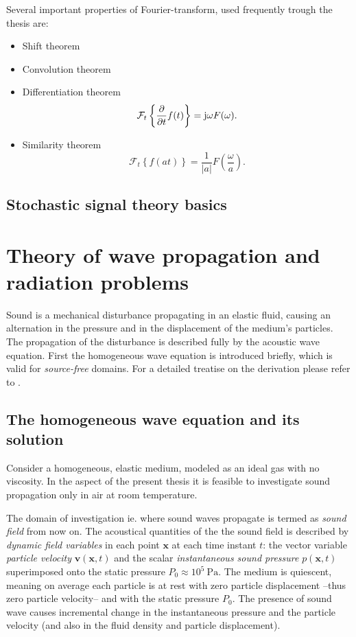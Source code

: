Several important properties of Fourier-transform, used frequently trough the thesis are:
\begin{itemize}
\item Shift theorem
%
\item Convolution theorem
%
\item Differentiation theorem
\begin{equation}
\mathcal{F}_{t} \left\{ \frac{\partial}{\partial t} f(t) \right\}  = \mathrm{j} \omega F(\omega).
\label{Eq:Math:Fourier_tr_diff}
\end{equation}
%
\item Similarity theorem
\begin{equation}
\mathcal{F}_{t} \left\{ f(a t) \right\}  = \frac{1}{|a|} F(\frac{\omega}{a}).
\label{Eq:Math:Fourier_tr_similarity}
\end{equation}
\end{itemize}
  

\subsection{Stochastic signal theory basics}

\newpage
\section{Theory of wave propagation and radiation problems}

Sound is a mechanical disturbance propagating in an elastic fluid, causing an alternation in the pressure and in the displacement of the medium's particles. The propagation of the disturbance is described fully by the acoustic wave equation. First the homogeneous wave equation is introduced briefly, which is valid for \emph{source-free} domains. For a detailed treatise on the derivation please refer to \cite{Beranek1993, Morse1968, Williams1999, Blackstock2000}.

\subsection{The homogeneous wave equation and its solution}

Consider a homogeneous, elastic medium, modeled as an ideal gas with no viscosity. In the aspect of the present thesis it is feasible to investigate sound propagation only in air at room temperature. 

%
The domain of investigation ie. where sound waves propagate is termed as \emph{sound field} from now on.
The acoustical quantities of the the sound field is described by \emph{dynamic field variables} in each point $\mathbf{x}$ at each time instant $t$: the vector variable \emph{particle velocity} $\mathbf{v}(\mathbf{x},t)$ and the scalar \emph{instantaneous sound pressure} $p(\mathbf{x},t)$ superimposed onto the static pressure $P_0 \approx 10^5~\mathrm{Pa}$.
The medium is quiescent, meaning on average each particle is at rest with zero particle displacement --thus zero particle velocity-- and with the static pressure $P_0$. 
The presence of sound wave causes incremental change in the instantaneous pressure and the particle velocity (and also in the fluid density and particle displacement).
%

